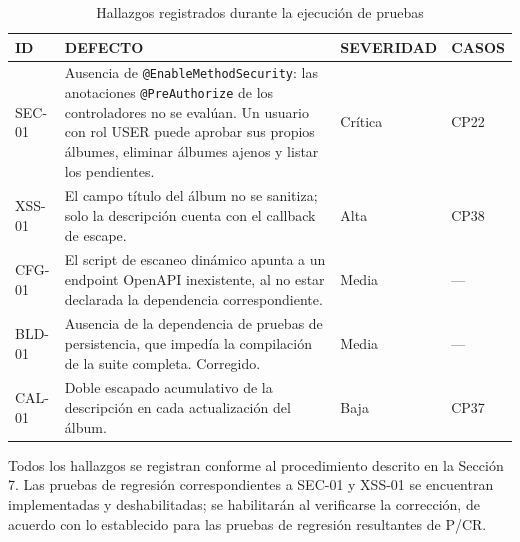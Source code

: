 \begin{table}[H]
\centering
\caption{Hallazgos registrados durante la ejecución de pruebas}
\label{tab:hallazgos_pruebas}
\begin{tabular}{|p{1.5cm}|p{8.5cm}|p{2.2cm}|p{1.6cm}|}
\hline
\textbf{ID} & \textbf{DEFECTO} & \textbf{SEVERIDAD} & \textbf{CASOS} \\
\hline
SEC-01 & Ausencia de \texttt{@EnableMethodSecurity}: las anotaciones \texttt{@PreAuthorize} de los controladores no se evalúan. Un usuario con rol USER puede aprobar sus propios álbumes, eliminar álbumes ajenos y listar los pendientes. & Crítica & CP22 \\
\hline
XSS-01 & El campo título del álbum no se sanitiza; solo la descripción cuenta con el callback de escape. & Alta & CP38 \\
\hline
CFG-01 & El script de escaneo dinámico apunta a un endpoint OpenAPI inexistente, al no estar declarada la dependencia correspondiente. & Media & --- \\
\hline
BLD-01 & Ausencia de la dependencia de pruebas de persistencia, que impedía la compilación de la suite completa. Corregido. & Media & --- \\
\hline
CAL-01 & Doble escapado acumulativo de la descripción en cada actualización del álbum. & Baja & CP37 \\
\hline
\end{tabular}
\end{table}

Todos los hallazgos se registran conforme al procedimiento descrito en la Sección 7. Las pruebas de regresión correspondientes a SEC-01 y XSS-01 se encuentran implementadas y deshabilitadas; se habilitarán al verificarse la corrección, de acuerdo con lo establecido para las pruebas de regresión resultantes de P/CR.
